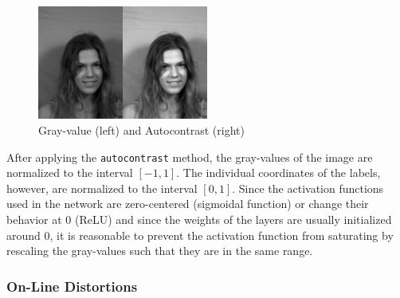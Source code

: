 \documentclass[11pt, a4paper]{article}
\begin{document}
\begin{figure}[htbp]
	\centering
	\includegraphics[width=0.5\textwidth]{gray_autocontrast.png}
	\caption{Gray-value (left) and Autocontrast (right)}
	\label{fig:autocontrast}
\end{figure}

After applying the \texttt{autocontrast} method, the gray-values of the image are normalized to the interval $[-1,1]$. The individual coordinates of the labels, however, are normalized to the interval $[0,1]$. Since the activation functions used in the network are zero-centered (sigmoidal function) or change their behavior at 0 (\ac{ReLU}) and since the weights of the layers are usually initialized around 0, it is reasonable to prevent the activation function from saturating by rescaling the gray-values such that they are in the same range.

\subsubsection{On-Line Distortions}
\end{document}
